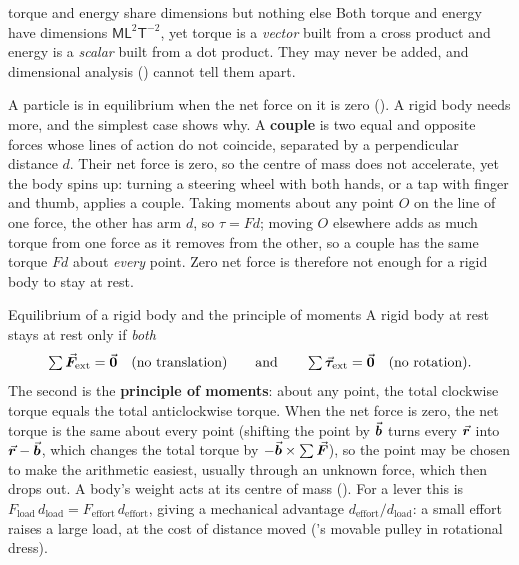 \begin{trapbox}{torque and energy share dimensions but nothing else}
Both torque and energy have dimensions $\mathsf M\mathsf L^2\mathsf T^{-2}$, yet torque is a
\emph{vector} built from a cross product and energy is a \emph{scalar} built from a dot product. They may
never be added, and dimensional analysis () cannot tell them apart.
\end{trapbox}


A particle is in equilibrium when the net force on it is zero (). A rigid body needs
more, and the simplest case shows why. A \textbf{couple} is two equal and opposite forces whose lines of
action do not coincide, separated by a perpendicular distance $d$. Their net force is zero, so the centre of
mass does not accelerate, yet the body spins up: turning a steering wheel with both hands, or a tap with
finger and thumb, applies a couple. Taking moments about any point $O$ on the line of one force, the
other has arm $d$, so $\tau=Fd$; moving $O$ elsewhere adds as much torque from one force as it removes
from the other, so a couple has the same torque $Fd$ about \emph{every} point. Zero net force is
therefore not enough for a rigid body to stay at rest.

\begin{keybox}{Equilibrium of a rigid body and the principle of moments}
A rigid body at rest stays at rest only if \emph{both}
\[
\textstyle\sum\vec{\bm{F}}_{\text{ext}}=\vec{\bm{0}}\quad\text{(no translation)}\qquad\text{and}\qquad
\sum\vec{\bm{\tau}}_{\text{ext}}=\vec{\bm{0}}\quad\text{(no rotation)}.
\]
The second is the \textbf{principle of moments}: about any point, the total clockwise torque equals the
total anticlockwise torque. When the net force is zero, the net torque is the same about every point
(shifting the point by $\vec{\bm{b}}$ turns every $\vec{\bm{r}}$ into $\vec{\bm{r}}-\vec{\bm{b}}$, which changes the total torque by $-\vec{\bm{b}}\times\sum\vec{\bm{F}}$), so the point may be
chosen to make the arithmetic easiest, usually through an unknown force, which then drops out. A body's
weight acts at its centre of mass (). For a lever this is
$F_{\text{load}}\,d_{\text{load}}=F_{\text{effort}}\,d_{\text{effort}}$, giving a mechanical advantage
$d_{\text{effort}}/d_{\text{load}}$: a small effort raises a large load, at the cost of distance moved
('s movable pulley in rotational dress).
\end{keybox}

